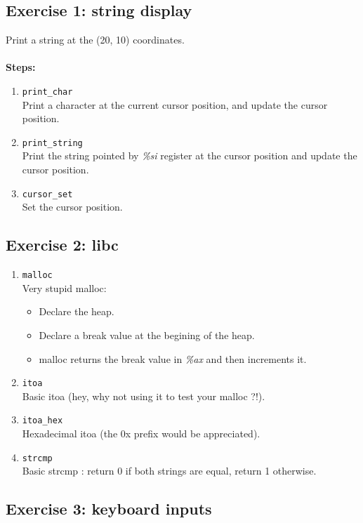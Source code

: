 \subsection*{Exercise 1: string display}
Print a string at the (20, 10) coordinates.\\
\\
{\bf Steps:}
\begin{enumerate}
\item {\tt print\_char}\\
Print a character at the current cursor position, and update the cursor position.
\item {\tt print\_string}\\
Print the string pointed by {\em \%si} register at the cursor position and update the cursor position.
\item{\tt cursor\_set}\\
Set the cursor position.
\end{enumerate}




\subsection*{Exercise 2: libc}


  \begin{enumerate}
  \item {\tt malloc}\\
  Very stupid malloc:
  \begin{itemize}
  \item Declare the heap.
  \item Declare a break value at the begining of the heap.
  \item malloc returns the break value in {\em \%ax} and then increments it.
  \end{itemize}
  \item {\tt itoa}\\
  Basic itoa (hey, why not using it to test your malloc ?!).
  \item {\tt itoa\_hex}\\
  Hexadecimal itoa (the 0x prefix would be appreciated).
  \item {\tt strcmp}\\
  Basic strcmp : return 0 if both strings are equal, return 1 otherwise.
  \end{enumerate}


\subsection*{Exercise 3: keyboard inputs}

